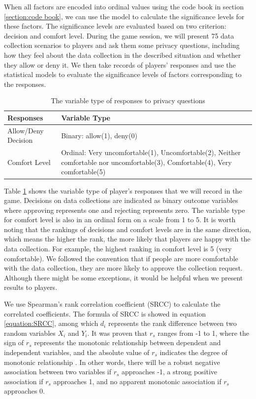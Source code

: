 \documentclass[msc,deptreport,ai]{infthesis}      %
\begin{document}
When all factors are encoded into ordinal values using the code book in section \ref{section:code book}, we can use the model to calculate the significance levels for these factors. The significance levels are evaluated based on two criterion: decision and comfort level. During the game session, we will present 75 data collection scenarios to players and ask them some privacy questions, including how they feel about the data collection in the described situation and whether they allow or deny it. We then take records of players' responses and use the statistical models to evaluate the significance levels of factors corresponding to the responses.

\begin{table}[htbp]
    \begin{center}
    \begin{tabular}{ |p{}| p{}|}
        \hline
        \textbf{Responses} & \textbf{Variable Type}\\
        \hline
        Allow/Deny Decision& Binary: allow(1), deny(0)\\
        \hline
        Comfort Level & Ordinal: Very uncomfortable(1), Uncomfortable(2), Neither comfortable nor uncomfortable(3), Comfortable(4), Very comfortable(5)\\
        \hline
        \end{tabular} 
    \end{center}
    \caption{The variable type of responses to privacy questions}
    \label{tab:responses}
\end{table}

Table \ref{tab:responses} shows the variable type of player's responses that we will record in the game. Decisions on data collections are indicated as binary outcome variables where approving represents one and rejecting represents zero. The variable type for comfort level is also in an ordinal form on a scale from 1 to 5. It is worth noting that the rankings of decisions and comfort levels are in the same direction, which means the higher the rank, the more likely that players are happy with the data collection. For example, the highest ranking in comfort level is 5 (very comfortable). We followed the convention that if people are more comfortable with the data collection, they are more likely to approve the collection request. Although there might be some exceptions, it would be helpful when we present results to players.

We use Spearman's rank correlation coefficient (SRCC) to calculate the correlated coefficients. The formula of SRCC is showed in equation \ref{equation:SRCC}, among which $d_i$ represents the rank difference between two random variables $X_i$ and $Y_i$. It was proven that $r_s$ ranges from -1 to 1, where the sign of $r_s$ represents the monotonic relationship between dependent and independent variables, and the absolute value of $r_s$ indicates the degree of monotonic relationship \cite{Myers}. In other words, there will be a robust negative association between two variables if $r_s$ approaches -1, a strong positive association if $r_s$ approaches 1, and no apparent monotonic association if $r_s$ approaches 0.
\end{document}
